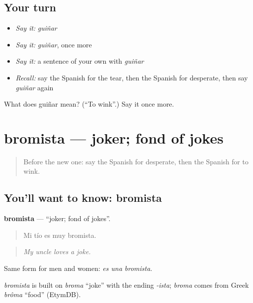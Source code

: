 \subsection*{Your turn}
\begin{itemize}
\raggedright
  \item \emph{Say it:} \emph{guiñar}
  \item \emph{Say it:} \emph{guiñar}, once more
  \item \emph{Say it:} a sentence of your own with \emph{guiñar}
  \item \emph{Recall:} say the Spanish for the tear, then the Spanish for desperate, then say \emph{guiñar} again
\end{itemize}

\begin{tcolorbox}[breakable,colback=teal!4,colframe=teal!35!black,title={Before you move on}]
What does guiñar mean? (\textquotedblleft{}To wink\textquotedblright{}.) Say it once more.
\end{tcolorbox}
\section[bromista]{bromista — joker; fond of jokes}

\label{lesson:ES-C718-bromista}



\begin{quote}
Before the new one: say the Spanish for desperate, then the Spanish for to wink.
\end{quote}

\subsection*{You'll want to know: bromista}
\textbf{bromista} — \textquotedblleft{}joker; fond of jokes\textquotedblright{}.

\begin{quote}
Mi tío es muy bromista.
\end{quote}

\begin{quote}
\emph{My uncle loves a joke.}
\end{quote}

Same form for men and women: \emph{es una bromista}.

\begin{cousinweb}
\emph{bromista} is built on \emph{broma} \textquotedblleft{}joke\textquotedblright{} with the ending \emph{-ista}; \emph{broma} comes from Greek \emph{brôma} \textquotedblleft{}food\textquotedblright{} (EtymDB).
\end{cousinweb}

